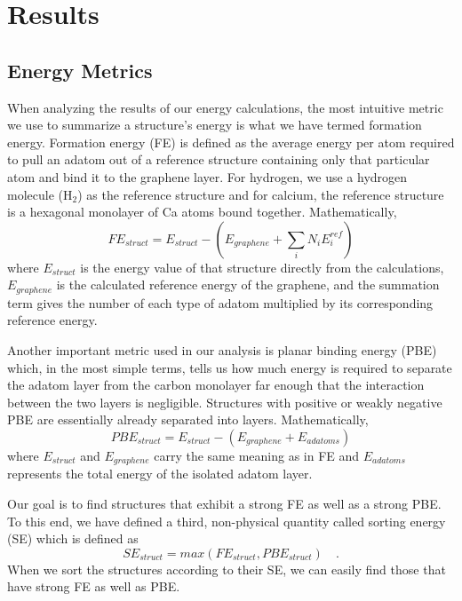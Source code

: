 \documentclass[oneside, noacknowlegments]{BYUPhys}
\begin{document}
\chapter{Results}

\section{Energy Metrics}

When analyzing the results of our energy calculations, the most 
intuitive metric we use to summarize a structure's energy is what 
we have termed formation energy. Formation energy (FE) is defined 
as the average energy per atom required to pull an adatom out of a 
reference structure containing only that particular atom and bind 
it to the graphene layer. For hydrogen, we use a hydrogen molecule 
($\mathrm{H_{2}}$) as the reference structure and for calcium, the 
reference structure is a hexagonal monolayer of Ca atoms bound 
together. Mathematically,
	\begin{equation} \label{form_E}
		FE_{struct} = E_{struct} - \left(E_{graphene} + \sum_{i}
		{N_{i}E_{i}^{ref}}\right)
	\end{equation}
where $E_{struct}$ is the energy value of that structure directly 
from the calculations, $E_{graphene}$ is the calculated reference 
energy of the graphene, and the summation term gives the number of 
each type of adatom multiplied by its corresponding reference 
energy.

Another important metric used in our analysis is planar binding 
energy (PBE) which, in the most simple terms, tells us how much 
energy is required to separate the adatom layer from the carbon 
monolayer far enough that the interaction between the two layers is 
negligible. Structures with positive or weakly negative PBE are 
essentially already separated into layers. Mathematically,
	\begin{equation} \label{pbE}
		PBE_{struct} = E_{struct} - \left(E_{graphene} + 
		E_{adatoms}\right) 
	\end{equation}
where $E_{struct}$ and $E_{graphene}$ carry the same meaning as in 
FE and $E_{adatoms}$ represents the total energy of the isolated 
adatom layer.

Our goal is to find structures that exhibit a strong FE as well as 
a strong PBE. To this end, we have defined a third, non-physical 
quantity called sorting energy (SE) which is defined as 
	\begin{equation} \label{inter_E}
		SE_{struct} = max\left(FE_{struct}, PBE_{struct}\right)
		\quad.
	\end{equation}
When we sort the structures according to their SE, we can easily 
find those that have strong FE as well as PBE.
\end{document}
